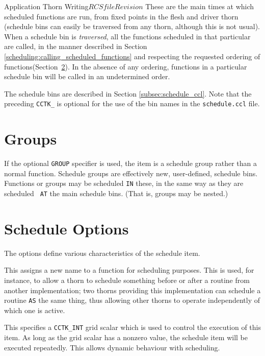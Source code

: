 \begin{cactuspart}{Application Thorn Writing}{$RCSfile$}{$Revision$}
These are the main times at which scheduled functions are run, from
fixed points in the flesh and driver thorn (schedule bins can easily
be traversed from any thorn, although this is not usual).  When a
schedule bin is \textit{traversed}, all the functions scheduled in that
particular are called, in the manner described in Section
\ref{scheduling:calling_scheduled_functions} and respecting the
requested ordering of functions(Section~\ref{scheduling:schedule_options}). In the absence of any ordering, functions in a particular schedule bin will be called in
an undetermined order.

The schedule bins are described in Section \ref{subsec:schedule_ccl}. Note that
the preceding \texttt{CCTK\_} is optional for the use of the bin names
in the \texttt{schedule.ccl} file.


\section{Groups}
\label{scheduling:groups}

If the optional \texttt{GROUP} specifier is used, the item is a schedule
group rather than a normal function.  Schedule groups are effectively
new, user-defined, schedule bins.  Functions or groups may be
scheduled \texttt{IN} these, in the same way as they are scheduled {\tt
AT} the main schedule bins.  (That is, groups may be nested.)


\section{Schedule Options}
\label{scheduling:schedule_options}
The options define various characteristics of the schedule item.

\begin{Lentry}
\item[\texttt{AS}]
This assigns a new name to a function for scheduling purposes.  This
is used, for instance, to allow a thorn to schedule something before
or after a routine from another implementation;  two thorns providing this
implementation can schedule a routine \texttt{AS} the same thing, thus
allowing other thorns to operate independently of which one is active.

\item[\texttt{WHILE}]
This specifies a \texttt{CCTK\_INT} grid scalar which is used to
control the execution of this item.  As long as the grid scalar has
a nonzero value, the schedule item will be executed repeatedly.  This
allows dynamic behaviour with scheduling.


\end{Lentry}
\end{cactuspart}
